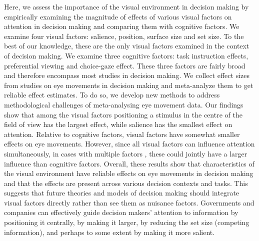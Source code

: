 Here, we assess the importance of the visual environment in decision making by empirically examining the magnitude of effects of various visual factors on attention in decision making and comparing them with cognitive factors. We examine four visual factors: salience, position, surface size and set size. To the best of our knowledge, these are the only visual factors examined in the context of decision making. We examine three cognitive factors: task instruction effects, preferential viewing and choice-gaze effect. These three factors are fairly broad and therefore encompass most studies in decision making. We collect effect sizes from studies on eye movements in decision making and meta-analyze them to get reliable effect estimates. To do so, we develop new methods to address methodological challenges of meta-analysing eye movement data. Our findings show that among the visual factors positioning a stimulus in the centre of the field of view has the largest effect, while salience has the smallest effect on attention. Relative to cognitive factors, visual factors have somewhat smaller effects on eye movements. However, since all visual factors can influence attention simultaneously, in cases with multiple factors \citep{gidloef2017a, orquin2019a}, these could jointly have a larger influence than cognitive factors. Overall, these results show that characteristics of the visual environment have reliable effects on eye movements in decision making and that the effects are present across various decision contexts and tasks. This suggests that future theories and models of decision making should integrate visual factors directly rather than see them as nuisance factors. Governments and companies can effectively guide decision makers' attention to information by positioning it centrally, by making it larger, by reducing the set size (competing information), and perhaps to some extent by making it more salient.  
